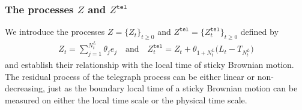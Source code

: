 \documentclass[10pt,a4paper]{article}
\numberwithin{equation}{section}
\theoremstyle{plain}
\theoremstyle{remark}
\begin{document}
\subsubsection{The processes $Z$ and $Z^\mathtt{tel}$}
We introduce the processes $Z=\{Z_t\}_{t \geq 0}$ and $Z^\mathtt{tel}=\{Z^\mathtt{tel}_t\}_{t\geq 0}$ defined by
\begin{align*}
Z_t = \sum_{j=1}^{N^L_t} \theta_j e_j \quad \textrm{and} \quad Z^\mathtt{tel}_t  = Z_t + \theta_{1 + N^L_t} \big(L_t - T_{N^L_t}\big)
\end{align*}
and establish their relationship with the local time of sticky Brownian motion. The residual process of the telegraph process can be either linear or non-decreasing, just as the boundary local time of a sticky Brownian motion can be measured on either the local time scale or the physical time scale.\\
\end{document}
